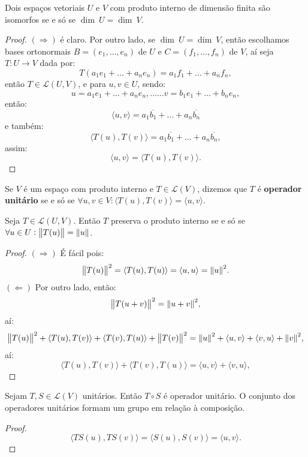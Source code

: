 \documentclass[11pt,twoside,a4paper]{book}
\begin{document}
\begin{corolario}
Dois espaços vetoriais $U$ e $V$ com produto interno de dimensão finita são isomorfos se e só se $\dim \ U=\dim \ V$.
\end{corolario}

\begin{proof}
$(\Rightarrow)$ é claro. Por outro lado, se $\dim \ U=\dim \ V$, então escolhamos bases ortonormais $B=(e_1,\dots,e_n)$ de $U$ e $C=(f_1,\dots,f_n)$ de $V$, aí seja $T:U\rightarrow V$ dada por:
\[
T(a_1e_1+\dots+a_ne_n)=a_1f_1+\dots+a_nf_n,
\]
então $T\in\mathcal{L}(U,V)$, e para $u,v\in U$, sendo:
\[
u=a_1e_1+\dots+a_ne_n,\dots\dots v=b_1e_1+\dots+b_ne_n,
\]
então:
\[
\langle u,v\rangle=a_1\overline{b_1}+\dots+a_n\overline{b_n}
\]
e também:
\[
\langle T(u),T(v)\rangle=a_1\overline{b_1}+\dots+a_n\overline{b_n},
\]
assim:
\[
\langle u,v\rangle=\langle T(u),T(v)\rangle.
\]
\end{proof}

\begin{definicao}
Se $V$ é um espaço com produto interno e $T\in\mathcal{L}(V)$, dizemos que $T$ é \textbf{operador unitário} se e só se $\forall u,v\in V:\langle T(u),T(v)\rangle=\langle u,v\rangle$.
\end{definicao}

\begin{teorema}
Seja $T\in\mathcal{L}(U,V)$. Então $T$ preserva o produto interno se e só se $\forall u\in U:\norm{T(u)}=\norm{u}$.
\end{teorema}
\begin{proof}
$(\Rightarrow)$ É fácil pois:
\[
\norm{T(u)}^2=\langle T(u),T(u)\rangle=\langle u,u\rangle=\norm{u}^2.
\]
$(\Leftarrow)$ Por outro lado, então:
\[
\norm{T(u+v)}^2=\norm{u+v}^2,
\]
aí:
\[
\norm{T(u)}^2+\langle T(u),T(v)\rangle+\langle T(v),T(u)\rangle+\norm{T(v)}^2=
\norm{u}^2+\langle u,v\rangle+\langle v,u\rangle+\norm{v}^2,
\]
aí:
\[
\langle T(u),T(v)\rangle+\langle T(v),T(u)\rangle=
\langle u,v\rangle+\langle v,u\rangle,
\]
\end{proof}

\begin{proposicao}
Sejam $T,S\in\mathcal{L}(V)$ unitários. Então $T\circ S$ é operador unitário. O conjunto dos operadores unitários formam um grupo em relação à composição.
\end{proposicao}
\begin{proof}
\[
\langle TS(u),TS(v)\rangle=\langle S(u),S(v)\rangle=\langle u,v\rangle.
\]
\end{proof}
\end{document}
